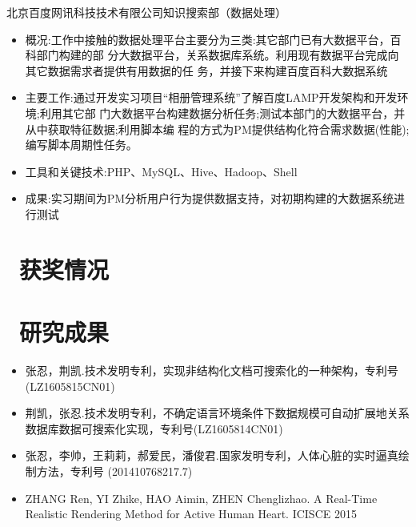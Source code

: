 \documentclass{resume}
\begin{document}
\begin{onehalfspacing}
北京百度网讯科技技术有限公司知识搜索部（数据处理）
\begin{itemize}
  \item 概况:工作中接触的数据处理平台主要分为三类:其它部门已有大数据平台，百科部门构建的部 分大数据平台，关系数据库系统。利用现有数据平台完成向其它数据需求者提供有用数据的任 务，并接下来构建百度百科大数据系统
  \item 主要工作:通过开发实习项目“相册管理系统”了解百度LAMP开发架构和开发环境;利用其它部 门大数据平台构建数据分析任务;测试本部门的大数据平台，并从中获取特征数据;利用脚本编 程的方式为PM提供结构化符合需求数据(性能);编写脚本周期性任务。
  \item 工具和关键技术:PHP、MySQL、Hive、Hadoop、Shell
  \item 成果:实习期间为PM分析用户行为提供数据支持，对初期构建的大数据系统进行测试
\end{itemize}
\end{onehalfspacing}

\section{\faHeartO\ 获奖情况}

\section{\faInfo\ 研究成果}
\begin{itemize}[parsep=0.5ex]
  \item 张忍，荆凯.技术发明专利，实现非结构化文档可搜索化的一种架构，专利号(LZ1605815CN01)
  \item 荆凯，张忍.技术发明专利，不确定语言环境条件下数据规模可自动扩展地关系数据库数据可搜索化实现，专利号(LZ1605814CN01)
  \item 张忍，李帅，王莉莉，郝爱民，潘俊君.国家发明专利，人体心脏的实时逼真绘制方法，专利号 (201410768217.7)
  \item ZHANG Ren, YI Zhike, HAO Aimin, ZHEN Chenglizhao. A Real-Time Realistic Rendering Method for Active Human Heart. ICISCE 2015
\end{itemize}

%
%
\end{document}
